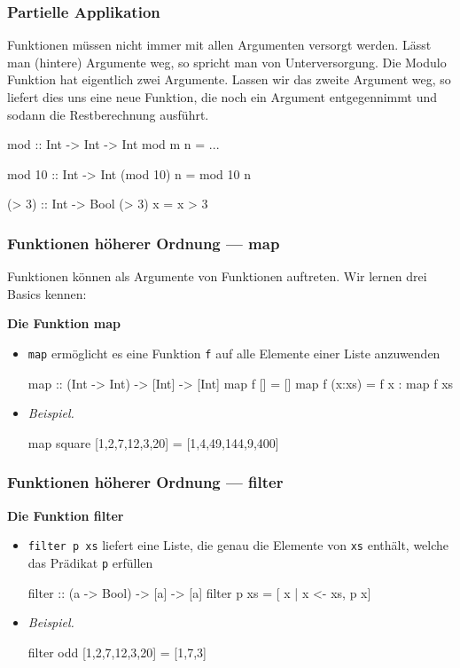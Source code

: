 \documentclass{beamer}
\begin{document}
\begin{frame}[fragile] \frametitle{Partielle Applikation}
	\footnotesize
	Funktionen müssen nicht immer mit allen Argumenten versorgt werden. Lässt man (hintere) Argumente weg, so spricht man von Unterversorgung.
	Die Modulo Funktion hat eigentlich zwei Argumente. Lassen wir das zweite Argument weg, so liefert dies uns eine neue Funktion, die noch ein Argument entgegennimmt und sodann die Restberechnung ausführt.
	\begin{codebox}
mod :: Int -> Int -> Int
mod m n = ...

mod 10 :: Int -> Int
(mod 10) n = mod 10 n
	\end{codebox}
	\pause
	\begin{codebox}
(> 3) :: Int -> Bool
(> 3) x = x > 3
	\end{codebox}
\end{frame}

\begin{frame}[fragile] \frametitle{Funktionen höherer Ordnung --- map}
	\footnotesize
	Funktionen können als Argumente von Funktionen auftreten. Wir lernen drei Basics kennen: \pause
	
	\textbf{Die Funktion map}
	\begin{itemize}
		\item \texttt{map} ermöglicht es eine Funktion \texttt{f} auf alle Elemente einer Liste anzuwenden \\[6pt]
		\begin{codebox}
map :: (Int -> Int) -> [Int] -> [Int] 
map f [] = [] 
map f (x:xs) = f x : map f xs
		\end{codebox}
		\item \textit{Beispiel.} \\[6pt]
		\begin{codebox}
map square [1,2,7,12,3,20] = [1,4,49,144,9,400]
		\end{codebox}
	\end{itemize}
\end{frame}

\begin{frame}[fragile] \frametitle{Funktionen höherer Ordnung --- filter}
	\footnotesize
	\textbf{Die Funktion filter}
	\begin{itemize}
		\item \texttt{filter p xs} liefert eine Liste, die genau die Elemente von \texttt{xs} enthält, welche das Prädikat \texttt{p} erfüllen \\[6pt]
		\begin{codebox}
filter :: (a -> Bool) -> [a] -> [a] 
filter p xs = [ x | x <- xs, p x]
		\end{codebox}
		\item \textit{Beispiel.} \\[6pt]
		\begin{codebox}
filter odd [1,2,7,12,3,20] = [1,7,3]
		\end{codebox}
	\end{itemize}
\end{frame}
\end{document}
